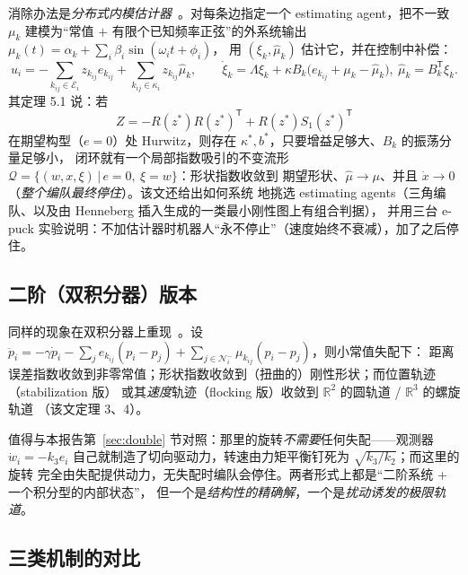 \documentclass[11pt,a4paper]{ctexart}
\theoremstyle{plain}
\theoremstyle{definition}
\theoremstyle{remark}
\newcommand{\R}{\mathbb{R}}
\newcommand{\calN}{\mathcal{N}}
\begin{document}
消除办法是\emph{分布式内模估计器}~\cite{tro2015}。对每条边指定一个 estimating agent，把不一致
$\mu_k$ 建模为“常值 $+$ 有限个已知频率正弦”的外系统输出 $\mu_k(t)=\alpha_k+\sum_i\beta_i\sin(\omega_it+\phi_i)$，
用 $(\xi_k,\hat\mu_k)$ 估计它，并在控制中补偿：
\begin{equation}
  u_i=-\sum_{k_{ij}\in\mathcal E_i}z_{k_{ij}}e_{k_{ij}}
      +\sum_{k_{ij}\in\kappa_i}z_{k_{ij}}\hat\mu_k,
  \qquad
  \dot\xi_k=\Lambda\xi_k+\kappa B_k\bigl(e_{k_{ij}}+\mu_k-\hat\mu_k\bigr),
  \ \hat\mu_k=B_k^{\mathsf T}\xi_k .
  \label{eq:internalmodel}
\end{equation}
其定理 5.1 说：若
\begin{equation}
  Z=-R(z^*)R(z^*)^{\mathsf T}+R(z^*)S_1(z^*)^{\mathsf T}
  \label{eq:Zmat}
\end{equation}
在期望构型（$e=0$）处 Hurwitz，则存在 $\kappa^*,b^*$，只要增益足够大、$B_k$ 的振荡分量足够小，
闭环就有一个局部指数吸引的不变流形 $\mathcal Q=\{(w,x,\xi)\,|\,e=0,\ \xi=w\}$：形状指数收敛到
期望形状、$\hat\mu\to\mu$、并且 $\dot x\to0$（\emph{整个编队最终停住}）。该文还给出如何系统
地挑选 estimating agents（三角编队、以及由 Henneberg 插入生成的一类最小刚性图上有组合判据），
并用三台 e-puck 实验说明：不加估计器时机器人“永不停止”（速度始终不衰减），加了之后停住。

\subsection{二阶（双积分器）版本}
\label{sec:meth_second}

同样的现象在双积分器上重现~\cite{sun2017robust}。设 $\ddot p_i=-\gamma\dot p_i
-\sum_j e_{k_{ij}}(p_i-p_j)+\sum_{j\in\calN_i^-}\mu_{k_{ij}}(p_i-p_j)$，则小常值失配下：
距离误差指数收敛到非零常值；形状指数收敛到（扭曲的）刚性形状；而位置轨迹（stabilization 版）
或其\emph{速度}轨迹（flocking 版）收敛到 $\R^2$ 的圆轨道 / $\R^3$ 的螺旋轨道
（该文定理 3、4）。

值得与本报告第~\ref{sec:double} 节对照：那里的旋转\emph{不需要}任何失配——观测器
$\dot w_i=-k_3e_i$ 自己就制造了切向驱动力，转速由力矩平衡钉死为 $\sqrt{k_3/k_2}$；而这里的旋转
完全由失配提供动力，无失配时编队会停住。两者形式上都是“二阶系统 + 一个积分型的内部状态”，
但一个是\emph{结构性的精确解}，一个是\emph{扰动诱发的极限轨道}。

\subsection{三类机制的对比}
\label{sec:meth_table}
\end{document}
